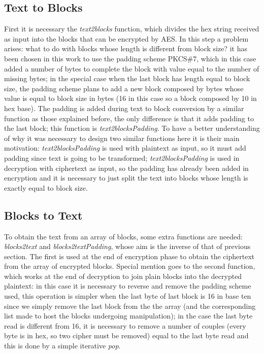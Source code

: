 \documentclass{article}
\begin{document}
\subsection{Text to Blocks}

First it is necessary the \textit{text2blocks} function, which divides the hex string received as input into the blocks that can be encrypted by AES. In this step a problem arises: what to do with blocks whose length is different from block size? it has been chosen in this work to use the padding scheme PKCS\#7, which in this case added a number of bytes to complete the block with value equal to the number of missing bytes; in the special case when the last block has length equal to block size, the padding scheme plans to add a new block composed by bytes whose value is equal to block size in bytes (16 in this case so a block composed by 10 in hex base). The padding is added during text to block conversion by a similar function as those explained before, the only difference is that it adds padding to the last block; this function is \textit{text2blocksPadding}. To have a better understanding of why it was necessary to design two similar functions here it is their main motivation: \textit{text2blocksPadding} is used with plaintext as input, so it must add padding since text is going to be transformed; \textit{text2blocksPadding} is used in decryption with ciphertext as input, so the padding has already been added in encryption and it is necessary to just split the text into blocks whose length is exactly equal to block size.

\subsection{Blocks to Text}

To obtain the text from an array of blocks, some extra functions are needed: \textit{blocks2text} and \textit{blocks2textPadding}, whose aim is the inverse of that of previous section. The first is used at the end of encryption phase to obtain the ciphertext from the array of encrypted blocks. Special mention goes to the second function, which works at the end of decryption to join plain blocks into the decrypted plaintext: in this case it is necessary to reverse and remove the padding scheme used, this operation is simpler when the last byte of last block is 16 in base ten since we simply remove the last block from the the array (and the corresponding list made to host the blocks undergoing manipulation); in the case the last byte read is different from 16, it is necessary to remove a number of couples (every byte is in hex, so two cipher must be removed) equal to the last byte read and this is done by a simple iterative \textit{pop}. 
\end{document}
